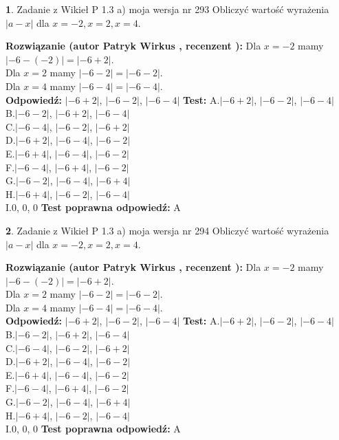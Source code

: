 \documentclass[12pt, a4paper]{article}
\theoremstyle{definition} %
\newtheorem{zad}{}
\newcommand{\zadStart}[1]{\begin{zad}#1\newline}
\newcommand{\zadStop}{\end{zad}}
\newcommand{\rozwStart}[2]{\noindent \textbf{Rozwiązanie (autor #1 , recenzent #2): }\newline}
\newcommand{\rozwStop}{\newline}
\newcommand{\odpStart}{\noindent \textbf{Odpowiedź:}\newline}
\newcommand{\odpStop}{\newline}
\newcommand{\testStart}{\noindent \textbf{Test:}\newline}
\newcommand{\testStop}{\newline}
\newcommand{\kluczStart}{\noindent \textbf{Test poprawna odpowiedź:}\newline}
\newcommand{\kluczStop}{\newline}
\begin{document}
\zadStart{Zadanie z Wikieł P 1.3 a) moja wersja nr 293}
Obliczyć wartość wyrażenia $|a - x|$ dla $x=-2,x=2,x=4$.
\zadStop
\rozwStart{Patryk Wirkus}{}
Dla $x = -2$ mamy $|-6 - (-2)| = |-6 + 2|$.\\
Dla $x = 2$ mamy $|-6 - 2| = |-6 - 2|$.\\
Dla $x = 4$ mamy $|-6 - 4| = |-6 - 4|$.\\
\rozwStop
\odpStart
$|-6 + 2|$, $|-6 - 2|$, $|-6 - 4|$
\odpStop
\testStart
A.$|-6 + 2|$, $|-6 - 2|$, $|-6 - 4|$\\
B.$|-6 - 2|$, $|-6 + 2|$, $|-6 - 4|$\\
C.$|-6 - 4|$, $|-6 - 2|$, $|-6 + 2|$\\
D.$|-6 + 2|$, $|-6 - 4|$, $|-6 - 2|$\\
E.$|-6 + 4|$, $|-6 - 4|$, $|-6 - 2|$\\
F.$|-6 - 4|$, $|-6 + 4|$, $|-6 - 2|$\\
G.$|-6 - 2|$, $|-6 - 4|$, $|-6 + 4|$\\
H.$|-6 + 4|$, $|-6 - 2|$, $|-6 - 4|$\\
I.$0$, $0$, $0$
\testStop
\kluczStart
A
\kluczStop



\zadStart{Zadanie z Wikieł P 1.3 a) moja wersja nr 294}
Obliczyć wartość wyrażenia $|a - x|$ dla $x=-2,x=2,x=4$.
\zadStop
\rozwStart{Patryk Wirkus}{}
Dla $x = -2$ mamy $|-6 - (-2)| = |-6 + 2|$.\\
Dla $x = 2$ mamy $|-6 - 2| = |-6 - 2|$.\\
Dla $x = 4$ mamy $|-6 - 4| = |-6 - 4|$.\\
\rozwStop
\odpStart
$|-6 + 2|$, $|-6 - 2|$, $|-6 - 4|$
\odpStop
\testStart
A.$|-6 + 2|$, $|-6 - 2|$, $|-6 - 4|$\\
B.$|-6 - 2|$, $|-6 + 2|$, $|-6 - 4|$\\
C.$|-6 - 4|$, $|-6 - 2|$, $|-6 + 2|$\\
D.$|-6 + 2|$, $|-6 - 4|$, $|-6 - 2|$\\
E.$|-6 + 4|$, $|-6 - 4|$, $|-6 - 2|$\\
F.$|-6 - 4|$, $|-6 + 4|$, $|-6 - 2|$\\
G.$|-6 - 2|$, $|-6 - 4|$, $|-6 + 4|$\\
H.$|-6 + 4|$, $|-6 - 2|$, $|-6 - 4|$\\
I.$0$, $0$, $0$
\testStop
\kluczStart
A
\kluczStop
\end{document}

